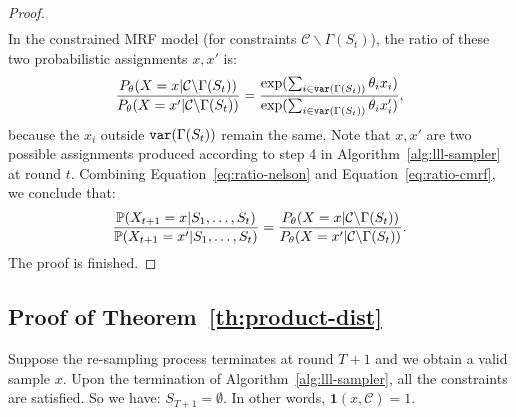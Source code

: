 \begin{lemma}
\begin{proof}
\begin{align*}
        \end{align*}
        In the constrained MRF model (for constraints  $\mathcal{C}\backslash\Gamma(S_t)$), the ratio of these two probabilistic assignments $x,x'$ is:
        \begin{equation}\label{eq:ratio-cmrf}
            \begin{aligned}
                \frac{P_{\theta}(X=x|\mathcal{C}\backslash \Gamma(S_t))}{P_{\theta}(X=x'|\mathcal{C}\backslash\Gamma(S_t))}=\frac{\exp(\sum_{i\in \mathtt{var}(\Gamma(S_t))}\theta_ix_i)}{\exp(\sum_{i\in \mathtt{var}(\Gamma(S_t))}\theta_ix'_i)},
            \end{aligned}
        \end{equation}
        because the $x_i$ outside $\mathtt{var}(\Gamma(S_t))$ remain the same. Note that $x,x'$ are two possible assignments produced according to step 4 in Algorithm~\ref{alg:lll-sampler} at round $t$.
        Combining Equation~\eqref{eq:ratio-nelson} and Equation~\eqref{eq:ratio-cmrf}, we conclude that:
        \begin{equation*}
            \begin{aligned}
                \frac{\mathbb{P}(X_{t+1}=x|S_1,\ldots,S_t)}{\mathbb{P}(X_{t+1}=x'|S_1,\ldots,S_t)}=\frac{P_{\theta}(X=x|\mathcal{C}\backslash \Gamma(S_t))}{P_{\theta}(X=x'|\mathcal{C}\backslash\Gamma(S_t))}.
            \end{aligned}
        \end{equation*}
        The proof is finished.
    \end{proof}
\end{lemma}
\subsection{Proof of Theorem~\ref{th:product-dist}}
Suppose the re-sampling process terminates at round $T+1$ and we obtain a valid sample $x$. Upon the termination of Algorithm~\ref{alg:lll-sampler}, all the constraints are satisfied. So we have: $S_{T+1}=\emptyset$. In other words, $\mathbf{1}(x,\mathcal{C})=1$.

